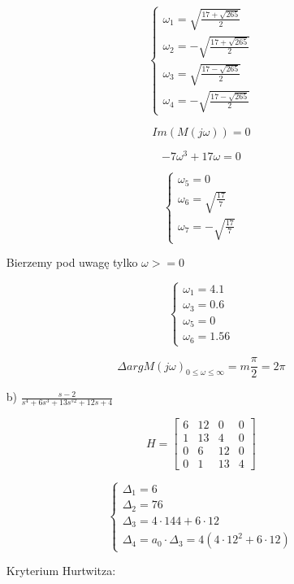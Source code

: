 \documentclass{article}
\begin{document}
\begin{itemize}
    \[\begin{cases}
        \omega_{1}=\sqrt{\frac{17+\sqrt{265}}{2}}
        \\
        \omega_{2}=-\sqrt{\frac{17+\sqrt{265}}{2}}
        \\
        \omega_{3}=\sqrt{\frac{17-\sqrt{265}}{2}}
        \\
        \omega_{4}=-\sqrt{\frac{17-\sqrt{265}}{2}}
    \end{cases}\]

    $$Im(M(j\omega))=0$$

    $$ -7\omega^{3}+17\omega=0 $$

    \[\begin{cases}
        \omega_{5}=0\\
        \omega_{6}=\sqrt{\frac{17}{7}}\\
        \omega_{7}=-\sqrt{\frac{17}{7}}
    \end{cases}\]

    Bierzemy pod uwagę tylko $\omega>=0$

    \[\begin{cases}
        \omega_{1}=4.1\\
        \omega_{3}=0.6\\
        \omega_{5}=0\\
        \omega_{6}=1.56
    \end{cases}\]

    $$\Delta argM(j\omega)_{0\leq \omega \le \infty }=m\frac{\pi}{2}=2\pi$$

    \item[b)] $\frac{s-2}{s^{4}+6s^{3}+13s^{s2}+12s+4}$

    $$ H=
    \begin{bmatrix}
        6 & 12 &  0 & 0\\
        1 & 13 &  4 & 0\\
        0 &  6 & 12 & 0\\
        0 &  1 & 13 & 4
        \end{bmatrix}$$

    \[\begin{cases}
        \Delta_{1}=6\\
        \Delta_{2}=76\\
        \Delta_{3}=4\cdot144+6\cdot12\\
        \Delta_{4}=a_{0}\cdot \Delta_{3}=4(4\cdot12^{2}+6\cdot12)
    \end{cases}\]

    Kryterium Hurtwitza:


\end{itemize}
\end{document}
